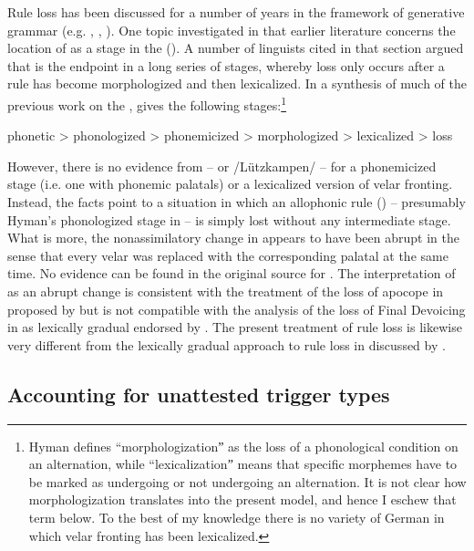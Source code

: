 Rule loss has been discussed for a number of years in the framework of generative grammar (e.g. \citealt{King1969}, \citealt{Hock1986}, \citealt{RingeEska2013}). One topic investigated in that earlier literature concerns the location of  as a stage in the  (). A  number of linguists cited in that section argued that  is the endpoint in a long series of stages, whereby loss only occurs after a rule has become morphologized and then lexicalized. In a synthesis of much of the previous work on the , \citet{Hyman2013} gives the following stages:\footnote{{Hyman defines “morphologizationˮ as the loss of a phonological condition on an alternation, while “lexicalizationˮ means that specific morphemes have to be marked as undergoing or not undergoing an alternation. It is not clear how morphologization translates into the present model, and hence I eschew that term below. To the best of my knowledge there is no variety of German in which velar fronting has been lexicalized.} }

\ea%
\label{ex:14:48}
phonetic > phonologized > phonemicized > morphologized > lexicalized > loss
\z 

However, there is no evidence from  -- or \slash{}Lützkamp\-en\slash{} -- for a phonemicized stage (i.e. one with phonemic palatals) or a lexicalized version of velar fronting. Instead, the facts point to a situation in which an allophonic rule () -- presumably Hyman’s phonologized stage in  -- is simply lost without any intermediate stage. What is more, the nonassimilatory change in  appears to have been abrupt in the sense that every velar was replaced with the corresponding palatal at the same time. No evidence can be found in the original source for . The interpretation of  as an abrupt change is consistent with the treatment of the loss of  apocope in  proposed by \citet{RingeEska2013} but is not compatible with the analysis of the loss of Final Devoicing in  as lexically gradual endorsed by \citet[268--269]{Hock1986}. The present treatment of rule loss is likewise very different from the lexically gradual approach to rule loss in  discussed by \citet{Tiersma1980}.\largerpage

\subsection{Accounting for unattested trigger types}\label{sec:14.6.4}

